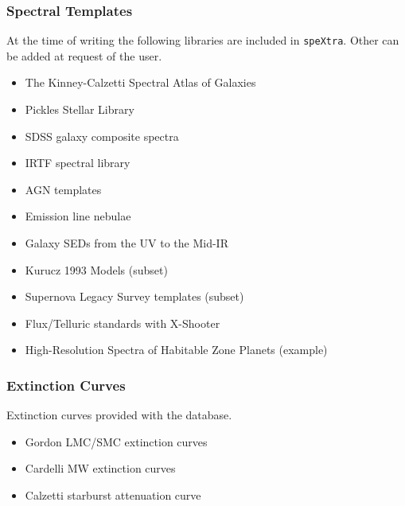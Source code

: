 \subsubsection{Spectral Templates%
  \label{spectral-templates}%
}

At the time of writing the following libraries are included in \texttt{speXtra}.
Other can be added at request of the user.

\begin{itemize}
\item The Kinney-Calzetti Spectral Atlas of Galaxies

\item Pickles Stellar Library

\item SDSS galaxy composite spectra

\item IRTF spectral library

\item AGN templates

\item Emission line nebulae

\item Galaxy SEDs from the UV to the Mid-IR

\item Kurucz 1993 Models (subset)

\item Supernova Legacy Survey templates (subset)

\item Flux/Telluric standards with X-Shooter

\item High-Resolution Spectra of Habitable Zone Planets (example)
\end{itemize}


\subsubsection{Extinction Curves%
  \label{extinction-curves}%
}

Extinction curves provided with the database.

\begin{itemize}
\item Gordon LMC/SMC extinction curves

\item Cardelli MW extinction curves

\item Calzetti starburst attenuation curve
\end{itemize}



